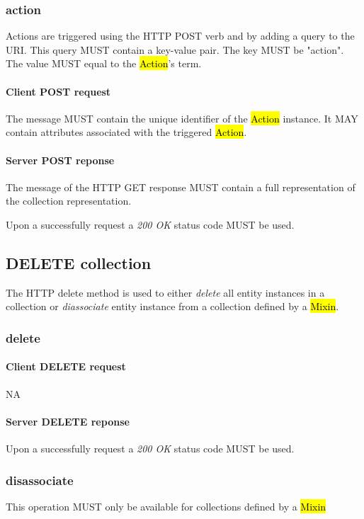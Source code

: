 \documentclass[10pt,a4paper]{article}
\begin{document}
\subsubsection{action}
Actions are triggered using the HTTP POST verb and by adding a query to the URI. This query MUST contain a key-value pair. The key MUST be "action". The value MUST equal to the \hl{Action}'s term.

\paragraph{Client POST request}
The message MUST contain the unique identifier of the \hl{Action} instance. It MAY contain attributes associated with the triggered \hl{Action}.

\paragraph{Server POST reponse}
The message of the HTTP GET response MUST contain a full representation of the collection representation.

Upon a successfully request a \emph{200 OK} status code MUST be used.

\subsection{DELETE collection}
The HTTP delete method is used to either {\em delete} all entity instances in a collection or {\em diassociate} entity instance from a collection defined by a \hl{Mixin}.

\subsubsection{delete}

\paragraph{Client DELETE request}
NA

\paragraph{Server DELETE reponse}
Upon a successfully request a \emph{200 OK} status code MUST be used.

\subsubsection{disassociate}
This operation MUST only be available for collections defined by a \hl{Mixin}
\end{document}
